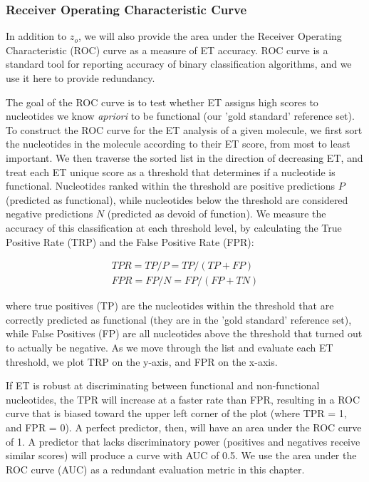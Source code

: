 \documentclass[12pt,a4paper]{report}
\begin{document}
\subsubsection{Receiver Operating Characteristic Curve}

In addition to $z_{o}$, we will also provide the area under the Receiver Operating Characteristic (ROC) curve as a measure of ET accuracy. ROC curve is a standard tool for reporting accuracy of binary classification algorithms, and we use it here to provide redundancy.

The goal of the ROC curve is to test whether ET assigns high scores to nucleotides we know \textit{apriori} to be functional  (our 'gold standard' reference set). To construct the ROC curve for the ET analysis of a given molecule, we first sort the nucleotides in the molecule according to their ET score, from most to least important. We then traverse the sorted list in the direction of decreasing ET, and treat each ET unique score as a threshold that determines if a nucleotide is functional. Nucleotides ranked within the threshold are positive predictions $P$ (predicted as functional), while nucleotides below the threshold are considered negative predictions $N$ (predicted as devoid of function). We measure the accuracy of this classification at each threshold level, by calculating the True Positive Rate (TRP) and the False Positive Rate (FPR):

\begin{equation*} \label{eq:tpr_fpr}
  \begin{aligned}
TPR = TP / P = TP / (TP + FP) \\
FPR = FP / N = FP / (FP + TN)
  \end{aligned}
\tag{9}
\end{equation*}

where true positives (TP) are the nucleotides within the threshold that are correctly predicted as functional (they are in the 'gold standard' reference set), while False Positives (FP) are all nucleotides above the threshold that turned out to actually be negative. As we move through the list and evaluate each ET threshold, we plot TRP on the y-axis, and FPR on the x-axis.

If ET is robust at discriminating between functional and non-functional nucleotides, the TPR will increase at a faster rate than FPR, resulting in a ROC curve that is biased toward the upper left corner of the plot (where TPR = 1, and FPR = 0). A perfect predictor, then, will have an area under the ROC curve of 1. A predictor that lacks discriminatory power (positives and negatives receive similar scores) will produce a curve with AUC of 0.5. We use the area under the ROC curve (AUC) as a redundant evaluation metric in this chapter.
\end{document}
